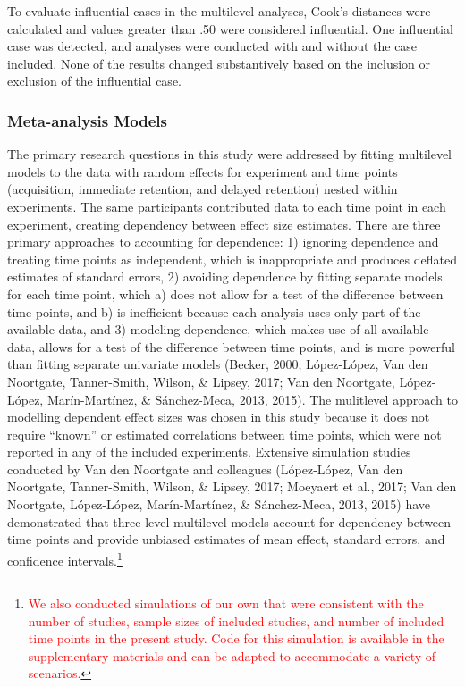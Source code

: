 \documentclass[
  english,
  man, donotrepeattitle,mask,floatsintext]{apa7}
\begin{document}
To evaluate influential cases in the multilevel analyses, Cook's distances were calculated and values greater than .50 were considered influential. One influential case was detected, and analyses were conducted with and without the case included. None of the results changed substantively based on the inclusion or exclusion of the influential case.

\hypertarget{meta-analysis-models}{%
\subsubsection{Meta-analysis Models}\label{meta-analysis-models}}

The primary research questions in this study were addressed by fitting multilevel models to the data with random effects for experiment and time points (acquisition, immediate retention, and delayed retention) nested within experiments. The same participants contributed data to each time point in each experiment, creating dependency between effect size estimates. There are three primary approaches to accounting for dependence: 1) ignoring dependence and treating time points as independent, which is inappropriate and produces deflated estimates of standard errors, 2) avoiding dependence by fitting separate models for each time point, which a) does not allow for a test of the difference between time points, and b) is inefficient because each analysis uses only part of the available data, and 3) modeling dependence, which makes use of all available data, allows for a test of the difference between time points, and is more powerful than fitting separate univariate models (Becker, 2000; López-López, Van den Noortgate, Tanner-Smith, Wilson, \& Lipsey, 2017; Van den Noortgate, López-López, Marín-Martínez, \& Sánchez-Meca, 2013, 2015). The mulitlevel approach to modelling dependent effect sizes was chosen in this study because it does not require ``known'' or estimated correlations between time points, which were not reported in any of the included experiments. Extensive simulation studies conducted by Van den Noortgate and colleagues (López-López, Van den Noortgate, Tanner-Smith, Wilson, \& Lipsey, 2017; Moeyaert et al., 2017; Van den Noortgate, López-López, Marín-Martínez, \& Sánchez-Meca, 2013, 2015) have demonstrated that three-level multilevel models account for dependency between time points and provide unbiased estimates of mean effect, standard errors, and confidence intervals.\footnote{\textcolor{red}{We also conducted simulations of our own that were consistent with the number of studies, sample sizes of included studies, and number of included time points in the present study. Code for this simulation is available in the supplementary materials and can be adapted to accommodate a variety of scenarios.}}
\end{document}
